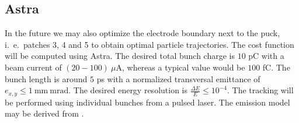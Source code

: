 \subsection{Astra}
In the future we may also optimize the electrode boundary next to the puck, i.~e.~patches 3, 4 and 5 to obtain optimal particle trajectories. The cost function will be computed using Astra.
The desired total bunch charge is $10$ pC with a beam current of $(20-100)\ \mu\mathrm{A}$, whereas a typical value would be $100$ fC. The bunch length is around $5$ ps with a normalized transversal emittance of $e_{x,y} \leq 1\ \mathrm{mm\: mrad}$. The desired energy resolution is $\frac{\Delta E}{E} \leq 10^{-4}$.
The tracking will be performed using individual bunches from a pulsed laser. The emission model may be derived from \cite{wagner}.
